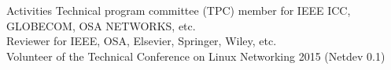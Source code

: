 \documentclass{resume} %
\begin{document}
\begin{rSection}{Activities}
Technical program committee (TPC) member for IEEE ICC, GLOBECOM, OSA NETWORKS, etc. \\
Reviewer for IEEE, OSA, Elsevier, Springer, Wiley, etc. \\
Volunteer of the Technical Conference on Linux Networking 2015 (Netdev 0.1)
\end{rSection}


\end{document}
